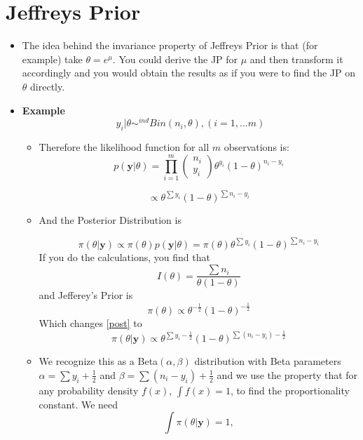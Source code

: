\documentclass[]{article}
\begin{document}
\section{Jeffreys Prior}
\begin{itemize}
	\item The idea behind the invariance property of Jeffreys Prior is that (for example) take $\theta = e^{\mu}$. You could derive the JP for $\mu$ and then transform it accordingly and you would obtain the results as if you were to find the JP on $\theta$ directly.
	\item \textbf{Example}
	\begin{equation*}
	y_{i}|\theta \sim^{ind} Bin(n_i,\theta), (i=1,...m)
	\end{equation*}
	\begin{itemize}
		\item Therefore the likelihood function for all $m$ observations is: 
		\begin{equation*}
		p(\textbf{y}|\theta) = \prod_{i=1}^{m}{\left(\begin{array}{c} n_i \\ y_i \end{array}\right)\theta^{y_i}(1-\theta)^{n_i-y_i}}
		\end{equation*}
		
		\begin{equation*}
		\propto\theta^{\sum{y_i}}(1-\theta)^{\sum{n_i-y_i}}
		\end{equation*}
		
		\item And the Posterior Distribution is
		
		\begin{equation}
		\pi(\theta|\textbf{y})\propto \pi(\theta)p(\textbf{y}|\theta)=\pi(\theta)\theta^{\sum{y_i}}(1-\theta)^{\sum{n_i-y_i}}
		\label{post}
		\end{equation}
	If you do the calculations, you find that 
	\begin{equation*}
	I(\theta) = \frac{\sum n_i}{\theta(1-\theta)}
	\end{equation*}
	and Jefferey's Prior is
	\begin{equation*}
	\pi(\theta) \propto \theta^{-\frac{1}{2}}(1-\theta)^{-\frac{1}{2}}
	\end{equation*}
	Which changes \ref{post} to 
	\begin{equation}
	\pi(\theta|\textbf{y})\propto \theta^{\sum{y_i}-\frac{1}{2}}(1-\theta)^{\sum{(n_i-y_i)}-\frac{1}{2}}
	\label{post1}
	\end{equation}
	\item We recognize this as a Beta$(\alpha,\beta)$ distribution with Beta parameters $\alpha = \sum{y_i}+\frac{1}{2}$ and $\beta = \sum{(n_i-y_i)}+\frac{1}{2}$ and we use the property that for any probability density $f(x)$, $\int{f(x)} = 1$, to find the proportionality constant. We need
	\begin{equation*}
	\int{\pi(\theta|\textbf{y})} = 1,
	\end{equation*}
	

\end{itemize}
\end{itemize}
\end{document}
